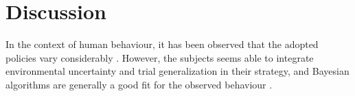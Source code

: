 
\section{Discussion}


In the context of human behaviour, it has been observed that the adopted policies vary considerably \cite{steyversBayesianAnalysisHuman2009a}. However, the subjects seems able to integrate environmental uncertainty and trial generalization in their strategy, and Bayesian algorithms are generally a good fit for the observed behaviour \cite{schulzFindingStructureMultiarmed2020, zhangForgetfulBayesMyopic2013}.




